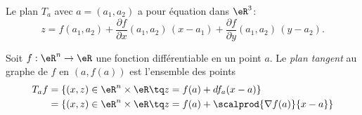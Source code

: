Le plan \( T_a\) avec \( a=(a_1,a_2)\) a pour équation dans \( \eR^3\):
\begin{equation}        \label{EqPlanTgEnDimDeux}
	z = f(a_1,a_2) + \frac{\partial f}{\partial x}(a_1,a_2)\,(x-a_1)+ \frac{\partial f}{\partial y}(a_1,a_2)\,(y-a_2).
\end{equation}

\begin{definition}
	Soit \( f : \eR^n \to\eR\) une fonction différentiable en un point
	\( a\). Le \emph{plan tangent} au graphe de \( f\) en \( (a,f(a))\) est
	l'ensemble des points
	\begin{equation*}
		\begin{split}
			T_af & = \{ (x,z) \in \eR^n \times \eR \tq z = f(a) + d f_a (x-a)\}                 \\
			     & = \{ (x,z) \in \eR^n \times \eR \tq z = f(a) + \scalprod{\nabla f(a)}{x-a}\}
		\end{split}
	\end{equation*}
\end{definition}




